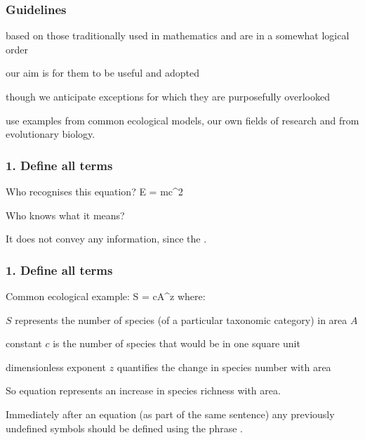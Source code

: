 
\begin{frame}
\frametitle{Guidelines}
\bi
  \item based on those traditionally used in mathematics and are in a somewhat
    logical order
  \item our aim is for them to be useful and adopted
  \item though we anticipate exceptions for which they are purposefully
    overlooked
  \item use examples from common ecological models, our own fields of research and from evolutionary biology.
\ei
\end{frame}


\begin{frame}
\frametitle{1. Define all terms}

Who recognises this equation?
\eb
\nonumber E = mc^2
\ee

\pause Who knows what it means?

\medskip

\pause It does not convey any information, since the .

\end{frame}


\begin{frame}
\frametitle{1. Define all terms}
Common ecological example:
\eb
\nonumber S = cA^z
\ee
\pause
where:
\bi
\item $S$ represents the number of species (of a particular taxonomic category)
in area $A$
\item constant $c$ is the
  number of species that would be in one square unit
\item dimensionless exponent $z$ quantifies the change in species number with area
\ei

\pause
So equation represents an increase in species richness with area.

\pause

Immediately after an equation (as part of the same sentence)
any previously undefined symbols should be defined using the phrase
.
\end{frame}


